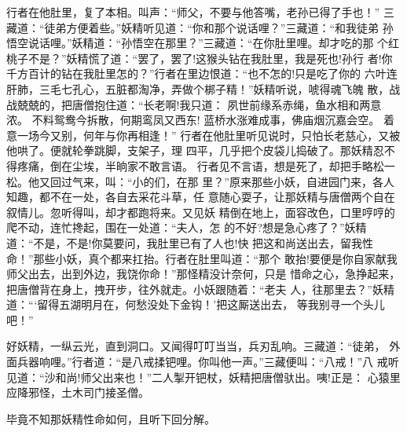 行者在他肚里，复了本相。叫声：“师父，不要与他答嘴，老孙已得了手也！”
三藏道：“徒弟方便着些。”妖精听见道：“你和那个说话哩？”三藏道：“和我徒弟
孙悟空说话哩。”妖精道：“孙悟空在那里？”三藏道：“在你肚里哩。却才吃的那
个红桃子不是？”妖精慌了道：“罢了，罢了!这猴头钻在我肚里，我是死也!孙行
者!你千方百计的钻在我肚里怎的？”行者在里边恨道：“也不怎的!只是吃了你的
六叶连肝肺，三毛七孔心，五脏都淘净，弄做个梆子精！”妖精听说，唬得魂飞魄
散，战战兢兢的，把唐僧抱住道：“长老啊!我只道：
夙世前缘系赤绳，鱼水相和两意浓。
不料鸳鸯今拆散，何期鸾凤又西东!
蓝桥水涨难成事，佛庙烟沉嘉会空。
着意一场今又别，何年与你再相逢！”
行者在他肚里听见说时，只怕长老慈心，又被他哄了。便就轮拳跳脚，支架子，理
四平，几乎把个皮袋儿捣破了。那妖精忍不得疼痛，倒在尘埃，半晌家不敢言语。
行者见不言语，想是死了，却把手略松一松。他又回过气来，叫：“小的们，在那
里？”原来那些小妖，自进园门来，各人知趣，都不在一处，各自去采花斗草，任
意随心耍子，让那妖精与唐僧两个自在叙情儿。忽听得叫，却才都跑将来。又见妖
精倒在地上，面容改色，口里哼哼的爬不动，连忙搀起，围在一处道：“夫人，怎
的不好?想是急心疼了？”妖精道：“不是，不是!你莫要问，我肚里已有了人也!快
把这和尚送出去，留我性命！”那些小妖，真个都来扛抬。行者在肚里叫道：“那个
敢抬!要便是你自家献我师父出去，出到外边，我饶你命！”那怪精没计奈何，只是
惜命之心，急挣起来，把唐僧背在身上，拽开步，往外就走。小妖跟随着：“老夫
人，往那里去？”妖精道：“‘留得五湖明月在，何愁没处下金钩！’把这厮送出去，
等我别寻一个头儿吧！”

好妖精，一纵云光，直到洞口。又闻得叮叮当当，兵刃乱响。三藏道：“徒弟，
外面兵器响哩。”行者道：“是八戒揉钯哩。你叫他一声。”三藏便叫：“八戒！”八
戒听见道：“沙和尚!师父出来也！”二人掣开钯杖，妖精把唐僧驮出。咦!正是：
心猿里应降邪怪，土木司门接圣僧。

毕竟不知那妖精性命如何，且听下回分解。